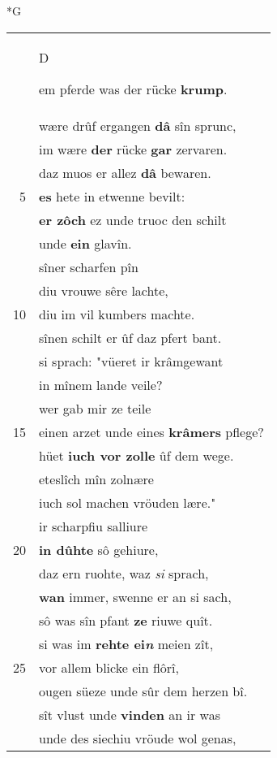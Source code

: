 \documentclass[8pt,a4paper,notitlepage]{article}
\begin{document}
\begin{table}[ht]
\begin{minipage}[t]{0.5\linewidth}
\small
\begin{center}*G
\end{center}
\begin{tabular}{rl}
 & \begin{large}D\end{large}em pferde was der rücke \textbf{krump}.\\ 
 & wære drûf ergangen \textbf{dâ} sîn sprunc,\\ 
 & im wære \textbf{der} rücke \textbf{gar} zervaren.\\ 
 & daz muos er allez \textbf{dâ} bewaren.\\ 
5 & \textbf{es} hete in etwenne bevilt:\\ 
 & \textbf{er zôch} ez unde truoc den schilt\\ 
 & unde \textbf{ein} glavîn.\\ 
 & sîner scharfen pîn\\ 
 & diu vrouwe sêre lachte,\\ 
10 & diu im vil kumbers machte.\\ 
 & sînen schilt er ûf daz pfert bant.\\ 
 & si sprach: "vüeret ir krâmgewant\\ 
 & in mînem lande veile?\\ 
 & wer gab mir ze teile\\ 
15 & einen arzet unde eines \textbf{krâmers} pflege?\\ 
 & hüet \textbf{iuch vor zolle} ûf dem wege.\\ 
 & eteslîch mîn zolnære\\ 
 & iuch sol machen vröuden lære."\\ 
 & ir scharpfiu salliure\\ 
20 & \textbf{in dûhte} sô gehiure,\\ 
 & daz ern ruohte, waz \textit{si} sprach,\\ 
 & \textbf{wan} immer, swenne er an si sach,\\ 
 & sô was sîn pfant \textbf{ze} riuwe quît.\\ 
 & si was im \textbf{rehte ei\textit{n}} meien zît,\\ 
25 & vor allem blicke ein flôrî,\\ 
 & ougen süeze unde sûr dem herzen bî.\\ 
 & sît vlust unde \textbf{vinden} an ir was\\ 
 & unde des siechiu vröude wol genas,\\ 

\end{tabular}
\end{minipage}
\end{table}
\end{document}

